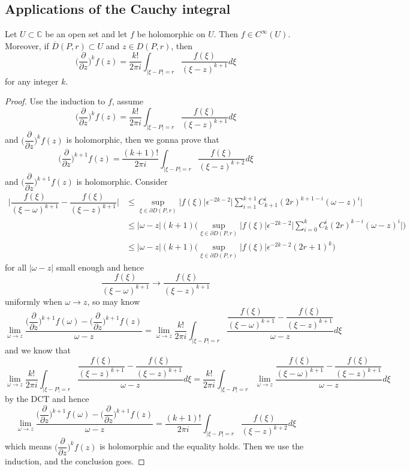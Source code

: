 \documentclass[lang=en, color=blue, ]{elegantbook}
\newcommand{\C}{\mathbb{C}}
\newcommand{\ParZ}{\dfrac{\partial}{\partial z}}
\begin{document}
\subsection*{Applications of the Cauchy integral}
\begin{theorem}
    Let $U\subset \C$ be an open set and let $f$ be holomorphic on $U$. Then $f\in C^{\infty}(U)$. Moreover, if $\overline{D}(P,r)\subset U$ and $z\in D(P,r)$, then
    \[
    \Big(\ParZ \big)^k f(z) = \dfrac{k!}{2\pi i}\int_{|\xi-P|=r}\dfrac{f(\xi)}{(\xi-z)^{k+1}}d\xi
    \]
    for any integer $k$.
\end{theorem}
\begin{proof}\par
    Use the induction to $f$, assume
    \[
    (\ParZ \big)^k f(z) = \dfrac{k!}{2\pi i}\int_{|\xi-P|=r}\dfrac{f(\xi)}{(\xi-z)^{k+1}}d\xi
    \]
    and $(\ParZ \big)^k f(z)$ is holomorphic, then we gonna prove that
    \[
    (\ParZ \big)^{k+1} f(z) = \dfrac{(k+1)!}{2\pi i}\int_{|\xi-P|=r}\dfrac{f(\xi)}{(\xi-z)^{k+2}}d\xi
    \]
    and $(\ParZ \big)^{k+1} f(z)$ is holomorphic. Consider
    \[
    \begin{aligned}
    \Big|\dfrac{f(\xi)}{(\xi-\omega)^{k+1}}-
    \dfrac{f(\xi)}{(\xi-z)^{k+1}}\Big| &\leq \sup_{\xi\in \partial D(P,r)}|f(\xi)| \epsilon^{-2k-2}\Big|\sum\limits_{i=1}^{k+1} C_{k+1}^{i}(2r)^{k+1-i}(\omega-z)^i\Big| \\
    & \leq |\omega-z|(k+1)\Big(\sup_{\xi\in \partial D(P,r)}|f(\xi)| \epsilon^{-2k-2}\Big|\sum\limits_{i=0}^{k} C_{k}^{i}(2r)^{k-i}(\omega-z)^i\Big|\Big)\\
    & \leq |\omega-z|(k+1)\Big(\sup_{\xi\in \partial D(P,r)}|f(\xi)| \epsilon^{-2k-2}(2r+1)^k\Big)
    \end{aligned}
    \]
    for all $|\omega-z|$ small enough and hence
    \[
    \dfrac{f(\xi)}{(\xi-\omega)^{k+1}} \to 
    \dfrac{f(\xi)}{(\xi-z)^{k+1}}
    \]
    uniformly when $\omega \to z$, so may know
    \[
    \lim_{\omega \to z} \dfrac{(\ParZ \big)^{k+1} f(\omega) - (\ParZ \big)^{k+1} f(z)}{\omega - z} = \lim_{\omega \to z} \dfrac{k!}{2\pi i}\int_{|\xi-P|=r}\dfrac{\dfrac{f(\xi)}{(\xi-\omega)^{k+1}}-\dfrac{f(\xi)}{(\xi-z)^{k+1}}}{\omega - z}d\xi
    \]
    and we know that
    \[
    \lim_{\omega \to z} \dfrac{k!}{2\pi i}\int_{|\xi-P|=r}\dfrac{\dfrac{f(\xi)}{(\xi-z)^{k+1}}-\dfrac{f(\xi)}{(\xi-z)^{k+1}}}{\omega - z}d\xi =  \dfrac{k!}{2\pi i}\int_{|\xi-P|=r}\lim_{\omega \to z}\dfrac{\dfrac{f(\xi)}{(\xi-\omega)^{k+1}}-\dfrac{f(\xi)}{(\xi-z)^{k+1}}}{\omega - z}d\xi
    \]
    by the DCT and hence
    \[
    \lim_{\omega \to z} \dfrac{(\ParZ \big)^{k+1} f(\omega) - (\ParZ \big)^{k+1} f(z)}{\omega - z}
    = \dfrac{(k+1)!}{2\pi i}\int_{|\xi-P|=r}\dfrac{f(\xi)}{(\xi-z)^{k+2}}d\xi
    \]
    which means $(\ParZ \big)^k f(z)$ is holomorphic and the equality holds. Then we use the induction, and the conclusion goes.
\end{proof}
\end{document}
